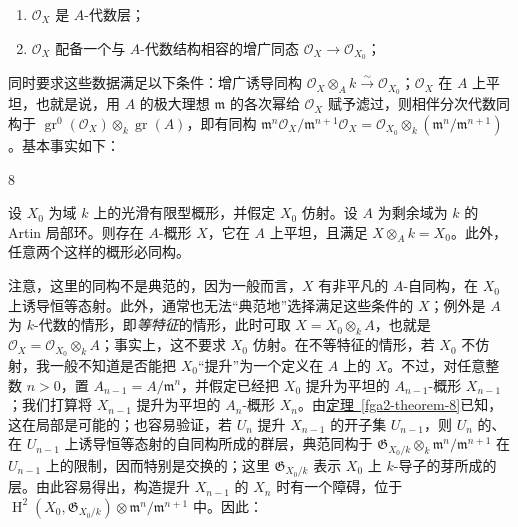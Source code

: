 \begin{enumerate}
    
 \item[i.]\(\mathcal {O}_X\) 是 \(A\)-代数层；

    
 \item[ii.]\(\mathcal {O}_X\) 配备一个与 \(A\)-代数结构相容的增广同态 \(\mathcal {O}_X\to \mathcal {O}_{X_0}\)；

  \end{enumerate} 同时要求这些数据满足以下条件：增广诱导同构 \(\mathcal {O}_X\otimes _A k\xrightarrow {\sim }\mathcal {O}_{X_0}\)；\(\mathcal {O}_X\) 在 \(A\) 上平坦，也就是说，用 \(A\) 的极大理想 \(\mathfrak {m}\) 的各次幂给 \(\mathcal {O}_X\) 赋予滤过，则相伴分次代数同构于 \(\operatorname {gr}^0(\mathcal {O}_X)\otimes _k\operatorname {gr}(A)\)，即有同构 \(\mathfrak {m}^n\mathcal {O}_X/\mathfrak {m}^{n+1}\mathcal {O}_X = \mathcal {O}_{X_0}\otimes _k(\mathfrak {m}^n/\mathfrak {m}^{n+1})\)。基本事实如下：
\begin{theorem}{8}\label{fga2-theorem-8}\skipsinglepar
\par{}设 \(X_0\) 为域 \(k\) 上的光滑有限型概形，并假定 \(X_0\) 仿射。设 \(A\) 为剩余域为 \(k\) 的 Artin 局部环。则存在 \(A\)-概形 \(X\)，它在 \(A\) 上平坦，且满足 \(X\otimes _A k=X_0\)。此外，任意两个这样的概形必同构。\end{theorem}
\par{}注意，这里的同构不是典范的，因为一般而言，\(X\) 有非平凡的 \(A\)-自同构，在 \(X_0\) 上诱导恒等态射。此外，通常也无法“典范地”选择满足这些条件的 \(X\)；例外是 \(A\) 为 \(k\)-代数的情形，即\emph{等特征}的情形，此时可取 \(X=X_0\otimes _k A\)，也就是 \(\mathcal {O}_X=\mathcal {O}_{X_0}\otimes _k A\)；事实上，这不要求 \(X_0\) 仿射。在不等特征的情形，若 \(X_0\) 不仿射，我一般不知道是否能把 \(X_0\)“提升”为一个定义在 \(A\) 上的 \(X\)。不过，对任意整数 \(n>0\)，置 \(A_{n-1}=A/\mathfrak {m}^n\)，并假定已经把 \(X_0\) 提升为平坦的 \(A_{n-1}\)-概形 \(X_{n-1}\)；我们打算将 \(X_{n-1}\) 提升为平坦的 \(A_n\)-概形 \(X_n\)。由\hyperref[fga2-theorem-8]{定理~\ref*{fga2-theorem-8}}已知，这在局部是可能的；也容易验证，若 \(U_n\) 提升 \(X_{n-1}\) 的开子集 \(U_{n-1}\)，则 \(U_n\) 的、在 \(U_{n-1}\) 上诱导恒等态射的自同构所成的群层，典范同构于 \(\mathfrak {G}_{X_0/k}\otimes _k\mathfrak {m}^n/\mathfrak {m}^{n+1}\) 在 \(U_{n-1}\) 上的限制，因而特别是交换的；这里 \(\mathfrak {G}_{X_0/k}\) 表示 \(X_0\) 上 \(k\)-导子的芽所成的层。由此容易得出，构造提升 \(X_{n-1}\) 的 \(X_n\) 时有一个障碍，位于 \(\operatorname {H}^2(X_0,\mathfrak {G}_{X_0/k})\otimes \mathfrak {m}^n/\mathfrak {m}^{n+1}\) 中。因此：
